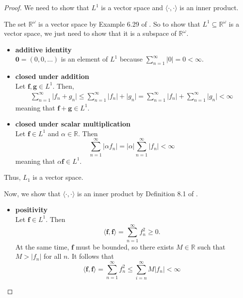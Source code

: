 \begin{proof}
    We need to show that $L^1$ is a vector space and $\langle \cdot, \cdot \rangle$ is an inner product.

    The set $\mathbb{R}^{\omega}$ is a vector space by Example 6.29 of \cite{axler2020}.
    So to show that $L^1 \subseteq \mathbb{R}^{\omega}$ is a vector space, we just need to show that it is a subspace of $\mathbb{R}^{\omega}$.
    \begin{itemize}
        \item \textbf{additive identity}\\
            $\mathbf{0} = (0, 0, \dots)$ is an element of $L^1$ because
            $\sum\limits_{n=1}^{\infty} \lvert 0 \rvert = 0 < \infty$.
        \item \textbf{closed under addition} \\
            Let $\mathbf{f}, \mathbf{g} \in L^1$.
            Then,
            \begin{align*}
                \sum\limits_{n=1}^{\infty} \lvert f_n + g_n \rvert
                \leq \sum\limits_{n=1}^{\infty} \lvert f_n \rvert + \lvert g_n \rvert
                = \sum\limits_{n=1}^{\infty} \lvert f_n \rvert + \sum\limits_{n=1}^{\infty} \lvert g_n \rvert
                < \infty
            \end{align*}
            meaning that $\mathbf{f} + \mathbf{g} \in L^1$.
        \item \textbf{closed under scalar multiplication} \\
            Let $\mathbf{f} \in L^1$ and $\alpha \in \mathbb{R}$.
            Then
            \begin{equation*}
                \sum\limits_{n=1}^{\infty} \lvert \alpha f_n \rvert
                = \lvert \alpha \rvert \sum\limits_{n=1}^{\infty} \lvert f_n \rvert
                < \infty
            \end{equation*}
            meaning that $\alpha \mathbf{f} \in L^1$.
    \end{itemize}
    Thus, $L_1$ is a vector space.

    Now, we show that $\langle \cdot , \cdot \rangle$ is an inner product by Definition 8.1 of \cite{axler2020}.
    \begin{itemize}
        \item \textbf{positivity}\\
            Let $\mathbf{f} \in L^1$.
            Then
            \begin{equation*}
                \langle \mathbf{f}, \mathbf{f} \rangle
                = \sum\limits_{n=1}^{\infty} f_n^2
                \geq 0.
            \end{equation*}
            At the same time, $\mathbf{f}$ must be bounded, so there exists $M \in \mathbb{R}$ such that $M > \lvert f_n \rvert$ for all $n$.
            It follows that
            \begin{equation*}
                \langle \mathbf{f}, \mathbf{f} \rangle
                = \sum\limits_{n=1}^{\infty} f_n^2
                \leq \sum\limits_{i=n}^{\infty}
                M \lvert f_n \rvert < \infty
            \end{equation*}


\end{itemize}
\end{proof}
